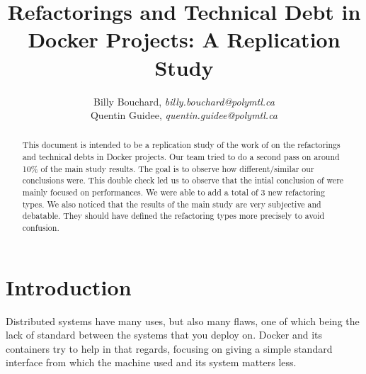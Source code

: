\documentclass[lettersize,journal]{IEEEtran}
\begin{document}
\title{Refactorings and Technical Debt in Docker Projects: A Replication Study}

\author{Billy Bouchard, \emph{billy.bouchard@polymtl.ca}\\
        Quentin Guidee, \emph{quentin.guidee@polymtl.ca}}



\maketitle

\begin{abstract}
This document is intended to be a replication study of the work of \cite{ksontini_refactorings_2021} on the refactorings and technical debts in Docker projects.
Our team tried to do a second pass on around 10\% of the main study results. The goal is to observe how different/similar our conclusions were.
This double check led us to observe that the intial conclusion of \cite{ksontini_refactorings_2021} were mainly focused on performances.
We were able to add a total of 3 new refactoring types.
We also noticed that the results of the main study are very subjective and debatable. They should have defined the refactoring types more precisely to avoid confusion.
\end{abstract}


\section{Introduction}

Distributed systems have many uses, but also many flaws, one of which being the lack of standard between the systems that you deploy on.
Docker \cite{noauthor_docker_2022} and its containers try to help in that regards, focusing on giving a simple standard interface from which the machine used and its system matters less.
\end{document}
